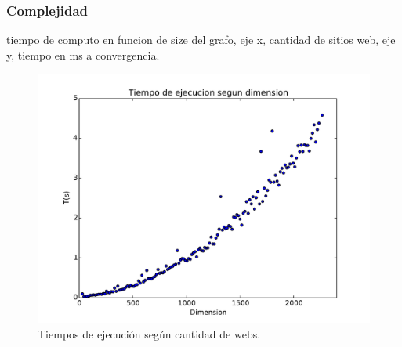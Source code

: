 \subsubsection{Complejidad}
tiempo de computo en funcion de size del grafo, eje x, cantidad de sitios web, eje y, tiempo en ms a convergencia.

\begin{figure}[h]
\centering
\includegraphics[scale=0.7]{images/complejidad.pdf}
\caption{Tiempos de ejecución según cantidad de webs.}
\label{timePageRank}
\end{figure}
